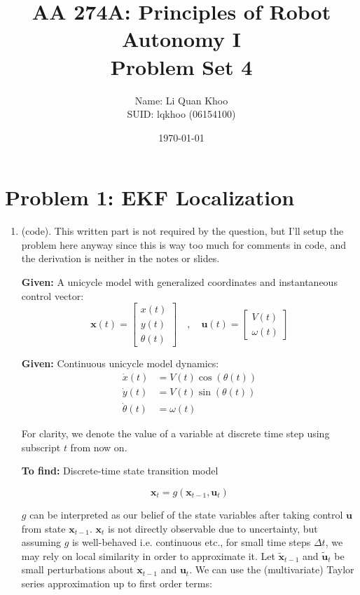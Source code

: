 \documentclass{article}
\title{AA 274A: Principles of Robot Autonomy I \\ Problem Set 4}
\author{Name: Li Quan Khoo     \\ SUID: lqkhoo (06154100)}
\date{\today}
\begin{document}
\maketitle
\pagestyle{fancy} 

\section*{Problem 1: EKF Localization}
\begin{enumerate}[label=(\roman*)]
\item %
(code). This written part is not required by the question, but I'll setup the problem here anyway since this is way too much for comments in code, and the derivation is neither in the notes or slides.

\textbf{Given:} A unicycle model with generalized coordinates and instantaneous control vector:
\begin{equation}
\mathbf{x}(t)=
\begin{bmatrix}
x(t) \\ y(t) \\ \theta(t)
\end{bmatrix}
\quad , \quad
\mathbf{u}(t) =
\begin{bmatrix}
V(t) \\ \omega(t)
\end{bmatrix}
\end{equation}

\textbf{Given:} Continuous unicycle model dynamics:
\begin{equation}
\begin{aligned}
\dot{x}(t) &= V(t) \cos(\theta(t)) \\
\dot{y}(t) &= V(t) \sin(\theta(t)) \\
\dot{\theta}(t) &= \omega(t)
\end{aligned}
\end{equation}

For clarity, we denote the value of a variable at discrete time step using subscript $t$ from now on.

\textbf{To find:} Discrete-time state transition model

\begin{equation}
\mathbf{x}_t = g(\mathbf{x}_{t-1}, \mathbf{u}_t)
\end{equation}

$g$ can be interpreted as our belief of the state variables after taking control $\mathbf{u}$ from state $\mathbf{x}_{t-1}$. $\mathbf{x}_t$ is not directly observable due to uncertainty, but assuming $g$ is well-behaved i.e. continuous etc., for small time steps $\Delta t$, we may rely on local similarity in order to approximate it. Let $\tilde{\mathbf{x}}_{t-1}$ and $\tilde{\mathbf{u}}_t$ be small perturbations about $\mathbf{x}_{t-1}$ and $\mathbf{u}_t$. We can use the (multivariate) Taylor series approximation up to first order terms:


\end{enumerate}
\end{document}
